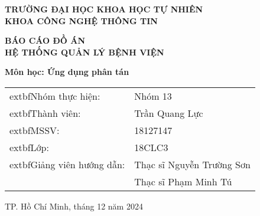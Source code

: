 \documentclass[12pt,a4paper]{report}
\begin{document}
\begin{titlepage}
    \centering
    \vspace*{1cm}
    
    {\Large\textbf{TRƯỜNG ĐẠI HỌC KHOA HỌC TỰ NHIÊN}}\\
    {\Large\textbf{KHOA CÔNG NGHỆ THÔNG TIN}}\\
    \vspace{1cm}
    \vspace{1cm}
    
    {\huge\textbf{BÁO CÁO ĐỒ ÁN}}\\
    \vspace{0.5cm}
    {\Large\textbf{HỆ THỐNG QUẢN LÝ BỆNH VIỆN}}\\
    \vspace{1cm}
    
    {\large\textbf{Môn học: Ứng dụng phân tán}}\\
    \vspace{2cm}
    
    \begin{tabular}{ll}
    		extbf{Nhóm thực hiện:} & Nhóm 13 \\
    		extbf{Thành viên:} & Trần Quang Lực \\
    		extbf{MSSV:} & 18127147 \\
    		extbf{Lớp:} & 18CLC3 \\
    		extbf{Giảng viên hướng dẫn:} & Thạc sĩ Nguyễn Trường Sơn \\
    & Thạc sĩ Phạm Minh Tú \\
    \end{tabular}
    
    \vfill
    {\large TP. Hồ Chí Minh, tháng 12 năm 2024}
\end{titlepage}
\end{document}
